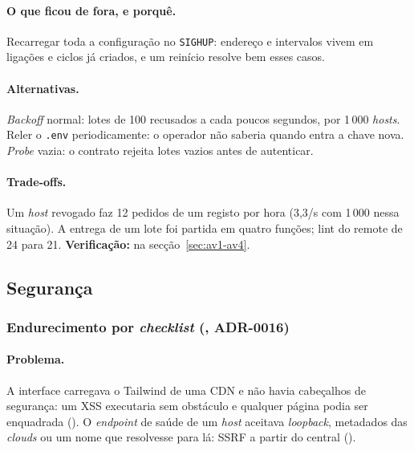\paragraph{O que ficou de fora, e porquê.}
Recarregar toda a configuração no \texttt{SIGHUP}: endereço e intervalos vivem em ligações e ciclos já criados,
e um reinício resolve bem esses casos.

\paragraph{Alternativas.}
\emph{Backoff} normal: lotes de 100 recusados a cada poucos segundos, por 1\,000 \emph{hosts}. Reler o
\texttt{.env} periodicamente: o operador não saberia quando entra a chave nova. \emph{Probe} vazia: o contrato
rejeita lotes vazios antes de autenticar.

\paragraph{Trade-offs.}
Um \emph{host} revogado faz 12 pedidos de um registo por hora (3,3/s com 1\,000 nessa situação). A entrega de um
lote foi partida em quatro funções; lint do remote de 24 para 21. \textbf{Verificação:}  na
secção~\ref{sec:av1-av4}.

\subsection{Segurança}

\subsubsection{Endurecimento por \emph{checklist} (, ADR-0016)}
\label{sec:d18}

\paragraph{Problema.}
A interface carregava o Tailwind de uma CDN e não havia cabeçalhos de segurança: um XSS executaria sem obstáculo e
qualquer página podia ser enquadrada (). O \emph{endpoint} de saúde de um \emph{host} aceitava
\emph{loopback}, metadados das \emph{clouds} ou um nome que resolvesse para lá: SSRF a partir do central ().

